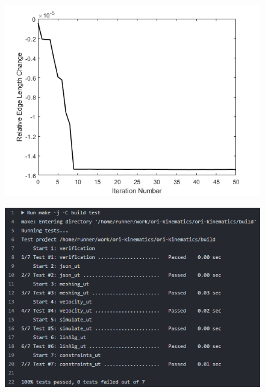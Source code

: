 \begin{figure}
\centering
\begin{minipage}{.5\textwidth}
  \centering
  \includegraphics[width=1\linewidth]{Graphics/euler-error.png}
  \label{fig:euler-error}
\end{minipage}%
\begin{minipage}{.5\textwidth}
  \centering
  \includegraphics[width=1\linewidth]{Graphics/test-pass.PNG}
  \label{fig:test-pass}
\end{minipage}
\end{figure}